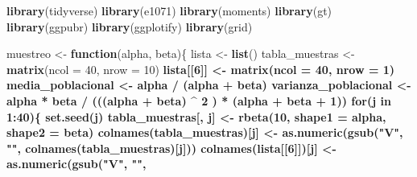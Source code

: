 \documentclass[
]{article}
\newenvironment{Shaded}{\begin{snugshade}}{\end{snugshade}}
\newcommand{\ControlFlowTok}[1]{\textcolor[rgb]{0.13,0.29,0.53}{\textbf{#1}}}
\newcommand{\DataTypeTok}[1]{\textcolor[rgb]{0.13,0.29,0.53}{#1}}
\newcommand{\DecValTok}[1]{\textcolor[rgb]{0.00,0.00,0.81}{#1}}
\newcommand{\KeywordTok}[1]{\textcolor[rgb]{0.13,0.29,0.53}{\textbf{#1}}}
\newcommand{\NormalTok}[1]{#1}
\newcommand{\OperatorTok}[1]{\textcolor[rgb]{0.81,0.36,0.00}{\textbf{#1}}}
\newcommand{\StringTok}[1]{\textcolor[rgb]{0.31,0.60,0.02}{#1}}
\begin{document}
\begin{Shaded}
\begin{Highlighting}[]
\KeywordTok{library}\NormalTok{(tidyverse)}
\KeywordTok{library}\NormalTok{(e1071)}
\KeywordTok{library}\NormalTok{(moments)}
\KeywordTok{library}\NormalTok{(gt)}
\KeywordTok{library}\NormalTok{(ggpubr)}
\KeywordTok{library}\NormalTok{(ggplotify)}
\KeywordTok{library}\NormalTok{(grid)}

\NormalTok{muestreo <-}\StringTok{ }\ControlFlowTok{function}\NormalTok{(alpha, beta)\{}
\NormalTok{        lista <-}\StringTok{ }\KeywordTok{list}\NormalTok{()}
\NormalTok{        tabla_muestras <-}\StringTok{ }\KeywordTok{matrix}\NormalTok{(}\DataTypeTok{ncol =} \DecValTok{40}\NormalTok{, }\DataTypeTok{nrow =} \DecValTok{10}\NormalTok{) }\OperatorTok{%>%}\StringTok{ }\KeywordTok{as.data.frame}\NormalTok{() }
\NormalTok{        lista[[}\DecValTok{6}\NormalTok{]] <-}\StringTok{ }\KeywordTok{matrix}\NormalTok{(}\DataTypeTok{ncol =} \DecValTok{40}\NormalTok{, }\DataTypeTok{nrow =} \DecValTok{1}\NormalTok{) }\OperatorTok{%>%}\StringTok{ }\KeywordTok{as.data.frame}\NormalTok{()}
\NormalTok{        media_poblacional <-}\StringTok{ }\NormalTok{alpha }\OperatorTok{/}\StringTok{ }\NormalTok{(alpha }\OperatorTok{+}\StringTok{ }\NormalTok{beta)}
\NormalTok{        varianza_poblacional <-}\StringTok{ }\NormalTok{alpha }\OperatorTok{*}\StringTok{ }\NormalTok{beta }\OperatorTok{/}\StringTok{ }\NormalTok{(((alpha }\OperatorTok{+}\StringTok{ }\NormalTok{beta) }\OperatorTok{^}\StringTok{ }\DecValTok{2}\NormalTok{ ) }\OperatorTok{*}\StringTok{ }\NormalTok{(alpha }\OperatorTok{+}\StringTok{ }\NormalTok{beta }\OperatorTok{+}\StringTok{ }\DecValTok{1}\NormalTok{))}
        \ControlFlowTok{for}\NormalTok{(j }\ControlFlowTok{in} \DecValTok{1}\OperatorTok{:}\DecValTok{40}\NormalTok{)\{}
                \KeywordTok{set.seed}\NormalTok{(j)}
\NormalTok{                tabla_muestras[, j] <-}\StringTok{ }\KeywordTok{rbeta}\NormalTok{(}\DecValTok{10}\NormalTok{, }\DataTypeTok{shape1 =}\NormalTok{ alpha, }\DataTypeTok{shape2 =}\NormalTok{ beta)}
                \KeywordTok{colnames}\NormalTok{(tabla_muestras)[j] <-}\StringTok{ }\KeywordTok{as.numeric}\NormalTok{(}\KeywordTok{gsub}\NormalTok{(}\StringTok{"V"}\NormalTok{, }\StringTok{""}\NormalTok{, }
                                                               \KeywordTok{colnames}\NormalTok{(tabla_muestras)[j]))}
                \KeywordTok{colnames}\NormalTok{(lista[[}\DecValTok{6}\NormalTok{]])[j] <-}\StringTok{  }\KeywordTok{as.numeric}\NormalTok{(}\KeywordTok{gsub}\NormalTok{(}\StringTok{"V"}\NormalTok{, }\StringTok{""}\NormalTok{, }
}}
\end{Highlighting}
\end{Shaded}
\end{document}
